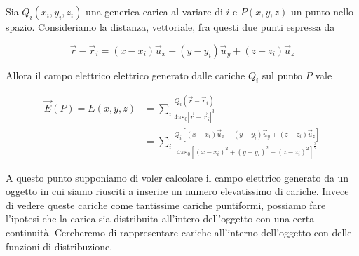 \begin{figure}[htpb]
\end{figure}
\FloatBarrier

Sia $Q_i(x_i,y_i,z_i)$ una generica carica al variare di $i$ e $P(x,y,z)$ un punto nello spazio. Consideriamo la distanza, vettoriale, fra questi due punti espressa da

\[
	\vec{r} - \vec{r}_i = (x-x_i )\vec{u}_x + (y-y_i )\vec{u}_y + (z-z_i)\vec{u}_z
\]

Allora il campo elettrico elettrico generato dalle cariche $Q_i$ sul punto $P$ vale

\begin{align*}
	\vec{E} (P) = E(x,y,z) &= \sum_i \frac{Q_i(\vec{r} - \vec{r}_i)}{4\pi \varepsilon_0 |\vec{r} -\vec{r}_i |^3} \\
	&= \sum_i \frac{Q_i [(x-x_i )\vec{u}_x + (y-y_i )\vec{u}_y + (z-z_i)\vec{u}_z]}{4\pi \varepsilon_0 [(x-x_i)^2 + (y-y_i)^2 + (z-z_i)^2]^{\frac{3}{2}}}
\end{align*}

A questo punto supponiamo di voler calcolare il campo elettrico generato da un oggetto in cui siamo riusciti a inserire un numero elevatissimo di cariche. Invece di vedere queste cariche come tantissime cariche puntiformi, possiamo fare l'ipotesi che la carica sia distribuita all'intero dell'oggetto con una certa continuità. Cercheremo di rappresentare cariche all'interno dell'oggetto con delle funzioni di distribuzione.

